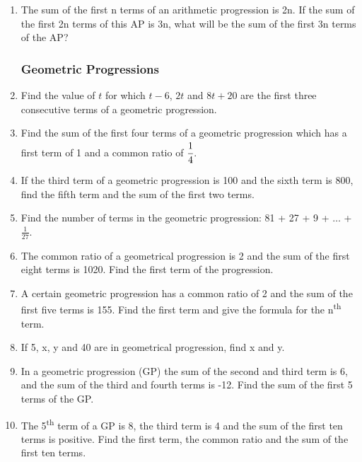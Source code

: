 \begin{enumerate}
	\item The sum of the first n terms of an arithmetic progression is 2n. If the sum of the first 2n terms of this AP is 3n, what will be the sum of the first 3n terms of the AP?
	
	
	
	
	

			\subsubsection{Geometric Progressions}
			
	\item Find the value of $t$ for which $t - 6$, $2t$ and $8t + 20$ are the first three consecutive terms of a geometric progression.
	
	\item Find the sum of the first four terms of a geometric progression which has a first term of 1 and a common ratio of $\cfrac{1}{4}$.
	
	\item If the third term of a geometric progression is 100 and the sixth term is 800, find the fifth term and the sum of the first two terms.
	
	\item Find the number of terms in the geometric progression: 81 + 27 + 9 + $\ldots$ + $\frac{1}{27}$.
	
	\item The common ratio of a geometrical progression is 2 and the sum of the first eight terms is 1020. Find the first term of the progression.
	
	\item A certain geometric progression has a common ratio of 2 and the sum of the first five terms is 155. Find the first term and give the formula for the n\textsuperscript{th} term.

	\item If 5, x, y and 40 are in geometrical progression, find x and y.
	
	\item In a geometric progression (GP) the sum of the second and third term is 6, and the sum of the third and fourth terms is -12. Find the sum of the first 5 terms of the GP.
	
	\item The 5\textsuperscript{th} term of a GP is 8, the third term is 4 and the sum of the first ten terms is positive. Find the first term, the common ratio and the sum of the first ten terms.
	

\end{enumerate}
